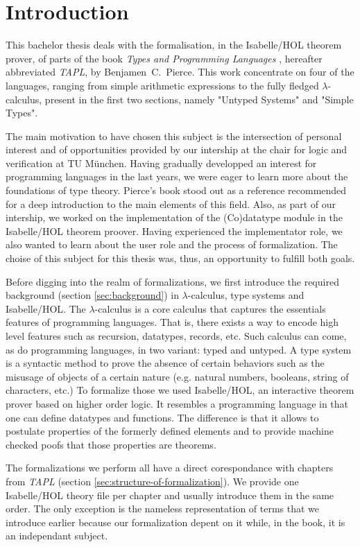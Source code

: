 \section{Introduction}

This bachelor thesis deals with the formalisation, in the Isabelle/HOL theorem prover, of parts of
the book \emph{Types and Programming Languages} \cite{pierce-2002-TAPL}, hereafter abbreviated
\emph{TAPL}, by Benjamen~C.~Pierce. This work concentrate on four of the languages, ranging from
simple arithmetic expressions to the fully fledged $\lambda$-calculus, present in the first two
sections, namely "Untyped Systems" and "Simple Types".

The main motivation to have chosen this subject is the intersection of personal interest and of
opportunities provided by our intership at the chair for logic and verification at TU München.
Having gradually developped an interest for programming languages in the last years, we were eager
to learn more about the foundations of type theory. Pierce's book stood out as a reference
recommended for a deep introduction to the main elements of this field. Also, as part of our
intership, we worked on the implementation of the (Co)datatype module in the Isabelle/HOL theorem
proover. Having experienced the implementator role, we also wanted to learn about the user role and
the process of formalization. The choise of this subject for this thesis was, thus, an opportunity
to fulfill both goals.

Before digging into the realm of formalizations, we first introduce the required background (section
\ref{sec:background}) in $\lambda$-calculus, type systems and Isabelle/HOL. The $\lambda$-calculus
is a core calculus that captures the essentials features of programming languages. That is, there
exists a way to encode high level features such as recursion, datatypes, records, etc. Such calculus
can come, as do programming languages, in two variant: typed and untyped. A type system is a
syntactic method to prove the absence of certain behaviors such as the misusage of objects of a
certain nature (e.g. natural numbers, booleans, string of characters, etc.) To formalize those we
used Isabelle/HOL, an interactive theorem prover based on higher order logic. It resembles a
programming language in that one can define datatypes and functions. The difference is that it
allows to postulate properties of the formerly defined elements and to provide machine checked poofs
that those properties are theorems.

The formalizations we perform all have a direct corespondance with chapters from \emph{TAPL}
(section \ref{sec:structure-of-formalization}). We provide one Isabelle/HOL theory file per chapter
and usually introduce them in the same order. The only exception is the nameless representation of
terms that we introduce earlier because our formalization depent on it while, in the book, it is an
independant subject.

